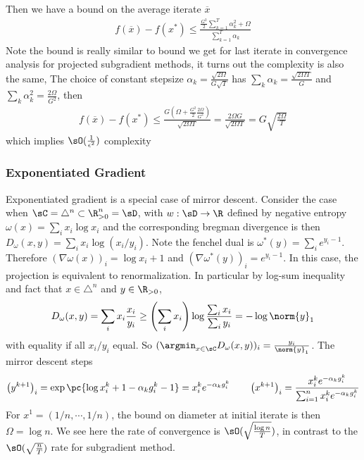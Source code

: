 \documentclass[../summary.tex]{subfiles}
\begin{document}
Then we have a bound on the average iterate $\overline{x}$
\begin{align*}
    f(\overline{x}) - f(x^*)
        \leq \frac{\frac{G^2}{2} \sum_{k=1}^T \alpha_k^2 + \Omega}{ \sum_{k=1}^T \alpha_k }
\end{align*}
Note the bound is really similar to bound we get for last iterate in convergence analysis for projected subgradient methods, it turns out the complexity is also the same, The choice of constant stepsize $\alpha_k = \frac{\sqrt{2\Omega}}{G\sqrt{T}}$ has $\sum_k \alpha_k = \frac{\sqrt{2\Omega T}}{G}$ and $\sum_k \alpha_k^2 = \frac{2\Omega}{G^2}$, then
\begin{align*}
    f(\overline{x}) - f(x^*)
        \leq \frac{ G(\Omega + \frac{G^2}{2}\frac{2\Omega}{G^2}) }{ \sqrt{2\Omega T} } 
        = \frac{2\Omega G}{\sqrt{2\Omega T}}
        = G \sqrt{\frac{2\Omega}{T}}
\end{align*}
which implies $\sO(\frac{1}{\epsilon^2})$ complexity


\subsubsection{Exponentiated Gradient}

Exponentiated gradient is a special case of mirror descent. Consider the case when $\sC = \triangle^n \subset \R_{>0}^n = \sD$, with $w:\sD\to\R$ defined by negative entropy $\omega(x) = \sum_i x_i \log x_i$ and the corresponding bregman divergence is then $D_{\omega}(x,y) = \sum_i x_i \log (x_i/y_i)$. Note the fenchel dual is $\omega^*(y) = \sum_i e^{y_i-1}$. Therefore $(\nabla \omega(x))_i = \log x_i + 1$ and $(\nabla \omega^*(y))_i = e^{y_i-1}$. In this case, the projection is equivalent to renormalization. In particular by log-sum inequality and fact that $x\in\triangle^n$ and $y\in\R_{> 0}$, 
\begin{align*}
    D_{\omega}(x,y)
        = \sum_i x_i \frac{x_i}{y_i}
        \geq \left(\sum_i x_i\right) \log \frac{\sum_i x_i}{\sum_i y_i}  = -\log \norm{y}_1
\end{align*}
with equality if all $x_i/y_i$ equal. So $(\argmin_{x\in\sC} D_{\omega}(x,y))_i = \frac{y_i}{\norm{y}_1}$. The mirror descent steps
\begin{align*}
    \left(y^{k+1}\right)_i
        = \exp\pc{
            \log x^k_i + 1 - \alpha_k g^k_i - 1
        }
        = x^k_i e^{-\alpha_k g^k_i}
        \qquad 
    \left( x^{k+1} \right)_i
        = \frac{x^k_i e^{-\alpha_k g^k_i}}{\sum_{i=1}^n x^k_i e^{-\alpha_k g^k_i}}
\end{align*}
For $x^1 = (1/n,\cdots,1/n)$, the bound on diameter at initial iterate is then $\Omega = \log n$. We see here the rate of convergence is $\sO(\sqrt{\frac{\log n}{T}})$, in contrast to the $\sO(\sqrt{\frac{n}{T}})$ rate for subgradient method.
\end{document}
